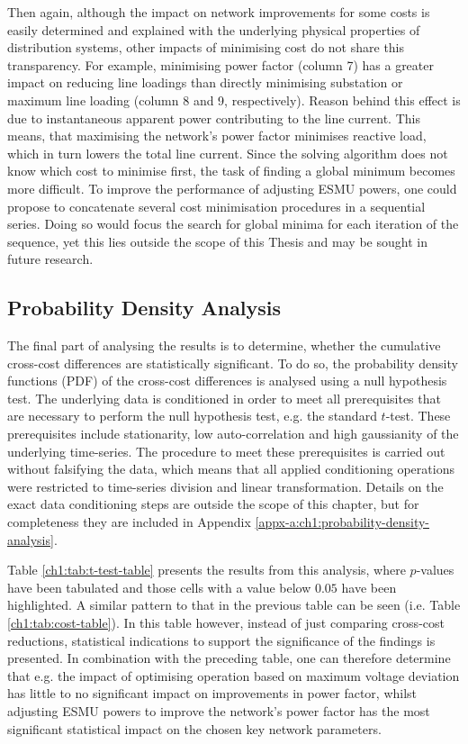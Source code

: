 Then again, although the impact on network improvements for some costs is easily determined and explained with the underlying physical properties of distribution systems, other impacts of minimising cost do not share this transparency.
For example, minimising power factor (column 7) has a greater impact on reducing line loadings than directly minimising substation or maximum line loading (column 8 and 9, respectively).
Reason behind this effect is due to instantaneous apparent power contributing to the line current.
This means, that maximising the network's power factor minimises reactive load, which in turn lowers the total line current.
Since the solving algorithm does not know which cost to minimise first, the task of finding a global minimum becomes more difficult.
To improve the performance of adjusting ESMU powers, one could propose to concatenate several cost minimisation procedures in a sequential series.
Doing so would focus the search for global minima for each iteration of the sequence, yet this lies outside the scope of this Thesis and may be sought in future research.

\subsection{Probability Density Analysis}
\label{ch1:subsec:probability-density-analysis}

The final part of analysing the results is to determine, whether the cumulative cross-cost differences are statistically significant.
To do so, the probability density functions (PDF) of the cross-cost differences is analysed using a null hypothesis test.
The underlying data is conditioned in order to meet all prerequisites that are necessary to perform the null hypothesis test, e.g. the standard $t$-test.
These prerequisites include stationarity, low auto-correlation and high gaussianity of the underlying time-series.
The procedure to meet these prerequisites is carried out without falsifying the data, which means that all applied conditioning operations were restricted to time-series division and linear transformation.
Details on the exact data conditioning steps are outside the scope of this chapter, but for completeness they are included in Appendix \ref{appx-a:ch1:probability-density-analysis}.



Table \ref{ch1:tab:t-test-table} presents the results from this analysis, where $p$-values have been tabulated and those cells with a value below $0.05$ have been highlighted.
A similar pattern to that in the previous table can be seen (i.e. Table \ref{ch1:tab:cost-table}).
In this table however, instead of just comparing cross-cost reductions, statistical indications to support the significance of the findings is presented.
In combination with the preceding table, one can therefore determine that e.g. the impact of optimising operation based on maximum voltage deviation has little to no significant impact on improvements in power factor, whilst adjusting ESMU powers to improve the network's power factor has the most significant statistical impact on the chosen key network parameters.